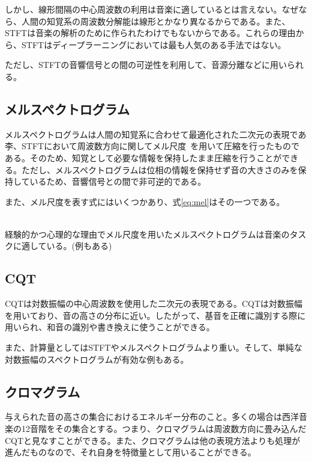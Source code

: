 しかし、線形間隔の中心周波数の利用は音楽に適しているとは言えない。なぜなら、人間の知覚系の周波数分解能は線形とかなり異なるからである。また、STFTは音楽の解析のために作られたわけでもないからである。これらの理由から、STFTはディープラーニングにおいては最も人気のある手法ではない。

ただし、STFTの音響信号との間の可逆性を利用して、音源分離などに用いられる。

\subsection{メルスペクトログラム}

メルスペクトログラムは人間の知覚系に合わせて最適化された二次元の表現であ李、STFTにおいて周波数方向に関してメル尺度~\cite{melscale}を用いて圧縮を行ったものである。そのため、知覚として必要な情報を保持したまま圧縮を行うことができる。ただし、メルスペクトログラムは位相の情報を保持せず音の大きさのみを保持しているため、音響信号との間で非可逆的である。

また、メル尺度を表す式にはいくつかあり、式\ref{eq:mel}はその一つである。

\begin{align}
    \label{eq:mel}
\end{align}

経験的かつ心理的な理由でメル尺度を用いたメルスペクトログラムは音楽のタスクに適している。(例もある)

\subsection{CQT}

CQTは対数振幅の中心周波数を使用した二次元の表現である。CQTは対数振幅を用いており、音の高さの分布に近い。したがって、基音を正確に識別する際に用いられ、和音の識別や書き換えに使うことができる。

また、計算量としてはSTFTやメルスペクトログラムより重い。そして、単純な対数振幅のスペクトログラムが有効な例もある。

\subsection{クロマグラム}

与えられた音の高さの集合におけるエネルギー分布のこと。多くの場合は西洋音楽の12音階をその集合とする。つまり、クロマグラムは周波数方向に畳み込んだCQTと見なすことができる。また、クロマグラムは他の表現方法よりも処理が進んだものなので、それ自身を特徴量として用いることができる。
